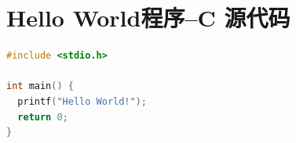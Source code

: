 \section{Hello World程序--C 源代码}

\begin{lstlisting}[language=c]
#include <stdio.h>

int main() {
  printf("Hello World!");
  return 0;
}
\end{lstlisting}

